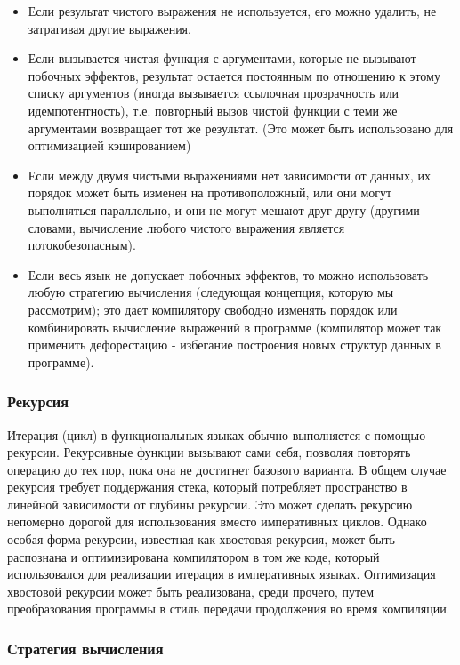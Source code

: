 \begin{itemize}
	\item Если результат чистого выражения не используется, его можно удалить, не затрагивая другие выражения.
	\item Если вызывается чистая функция с аргументами, которые не вызывают побочных эффектов, результат остается постоянным по отношению к этому списку аргументов (иногда вызывается ссылочная прозрачность или идемпотентность), т.е. повторный вызов чистой функции с теми же аргументами возвращает тот же результат. (Это может быть использовано для оптимизацией кэшированием)
	\item Если между двумя чистыми выражениями нет зависимости от данных, их порядок может быть изменен на противоположный, или они могут выполняться параллельно, и они не могут мешают друг другу (другими словами, вычисление любого чистого выражения является потокобезопасным).
	\item Если весь язык не допускает побочных эффектов, то можно использовать любую стратегию вычисления (следующая концепция, которую мы рассмотрим); это дает компилятору свободно изменять порядок или комбинировать вычисление выражений в программе (компилятор может так применить дефорестацию - избегание построения новых структур данных в программе).
\end{itemize}

\subsubsection{Рекурсия}

Итерация (цикл) в функциональных языках обычно выполняется с помощью рекурсии.
Рекурсивные функции вызывают сами себя, позволяя повторять операцию до тех пор, пока она не достигнет базового варианта.
В общем случае рекурсия требует поддержания стека, который потребляет пространство в линейной зависимости от глубины рекурсии.
Это может сделать рекурсию непомерно дорогой для использования вместо императивных циклов.
Однако особая форма рекурсии, известная как хвостовая рекурсия, может быть распознана и оптимизирована компилятором в том же коде, который использовался для реализации итерация в императивных языках.
Оптимизация хвостовой рекурсии может быть реализована, среди прочего, путем преобразования программы в стиль передачи продолжения во время компиляции.

\subsubsection{Стратегия вычисления}

